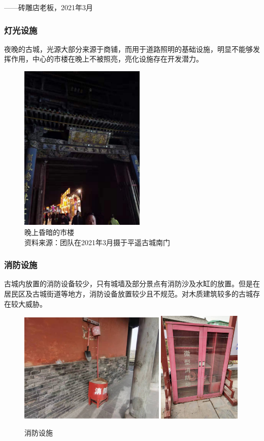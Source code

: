 \documentclass[UTF8]{ctexart}
\begin{document}
        \begin{flushright}
        ——砖雕店老板，2021年3月
        \end{flushright}

        \subsubsection{灯光设施}
        夜晚的古城，光源大部分来源于商铺，而用于道路照明的基础设施，明显不能够发挥作用，中心的市楼在晚上不被照亮，亮化设施存在开发潜力。
        \begin{figure}[H]
            \centering
            \includegraphics[width=6cm]{市楼亮化.jpg}
            \caption[plain]{晚上昏暗的市楼\\资料来源：团队在2021年3月摄于平遥古城南门}
            \label{fig:my_label}
        \end{figure}
        \subsubsection{消防设施}
        古城内放置的消防设备较少，只有城墙及部分景点有消防沙及水缸的放置。但是在居民区及古城街道等地方，消防设备放置较少且不规范。对木质建筑较多的古城存在较大威胁。
        \begin{figure}[H]
            \centering
            \includegraphics[width=7cm]{图片 15.png}
            \includegraphics[width=4cm]{图片 17.png}
            \caption{消防设施}
            \label{fig:my_label}
        \end{figure}
\end{document}
